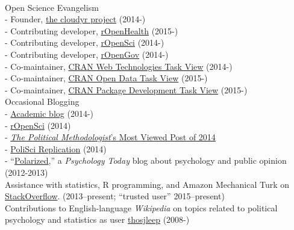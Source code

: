 \documentclass[12pt]{article}
\renewcommand{\section}[1]{\pagebreak[3]%
    \llap{\scshape\smash{\parbox[t]{\marginparwidth}{\raggedright {\color{lg}#1}}}}%
    \vspace{-\baselineskip}\par}
\newcommand{\topic}[1]{\pagebreak[3]\indent {\color{lg}{\footnotesize #1 }}\\}
\newcommand{\entry}[1]{\indent {\color{lg}\guillemotright}\hspace{2pt}#1\vspace{.25em}\\}
\newcommand{\subentry}[1]{{\color{lg}-} #1\vspace{.25em}\\}
\begin{document}
\topic{Public Engagement}
\entry{Open Science Evangelism}
\subentry{Founder, \href{http://cloudyr.github.io/}{the cloudyr project} (2014-)}
\subentry{Contributing developer, \href{http://ropensci.org/}{rOpenHealth} (2015-)}
\subentry{Contributing developer, \href{http://ropensci.org/}{rOpenSci} (2014-)}
\subentry{Contributing developer, \href{http://ropengov.github.io/}{rOpenGov} (2014-)}
\subentry{Co-maintainer, \href{http://cran.r-project.org/web/views/WebTechnologies.html}{CRAN Web Technologies Task View} (2014-)}
\subentry{Co-maintainer, \href{https://www.github.com/ropensci/opendata}{CRAN Open Data Task View} (2015-)}
\subentry{Co-maintainer, \href{https://www.github.com/leeper/PackageDevelopment}{CRAN Package Development Task View} (2015-)}
\entry{Occasional Blogging}
\subentry{\href{http://thomasleeper.com/blog}{Academic blog} (2014-)}
\subentry{\href{http://ropensci.org/blog/}{rOpenSci} (2014)}
\subentry{\href{http://thepoliticalmethodologist.com/2015/01/05/introducing-the-annual-tpm-most-viewed-post-award-and-our-2014-winner/}{\textit{The Political Methodologist}'s Most Viewed Post of 2014}}
\subentry{\href{http://politicalsciencereplication.wordpress.com/}{PoliSci Replication} (2014)}
\subentry{``\href{http://www.psychologytoday.com/blog/polarized}{Polarized},'' a {\em Psychology Today} blog about psychology and public opinion (2012-2013)}
\entry{Assistance with statistics, R programming, and Amazon Mechanical Turk on \href{http://stackoverflow.com/users/2338862/thomas}{StackOverflow}. (2013--present; ``trusted user'' 2015--present)}
\entry{Contributions to English-language {\em Wikipedia} on topics related to political psychology and statistics as user \href{http://en.wikipedia.org/wiki/Special:Contributions/Thosjleep}{thosjleep} (2008-)}

\end{document}
